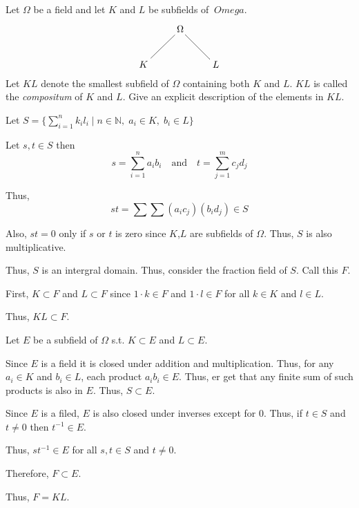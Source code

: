 \documentclass[12pt, letterpaper]{article}
\newcommand{\N}{\mathbb{N}}
\renewcommand{\t}[1]{\text{#1}}
\begin{document}
\color{\TextColor}
\pagecolor{\colormode}
\setlength{\parindent}{0pt}
\pagestyle{fancy}
\fancyhf{}
\fancyhead[ROE]{\color{\TextColor}\thepage}

\begin{problem}{}
    Let $\Omega$ be a field and let $K$ and $L$ be subfields of $\
Omega$.
\begin{equation*}
\xymatrix{
& \Omega\ar@{-}[dl]\ar@{-}[dr] &\\
K\ar@{-} & & L\ar@{-}\\
}
\end{equation*}
Let $KL$ denote the smallest subfield of $\Omega$ containing both $K$ and $L$. $KL$
is called the \textit{compositum} of $K$ and $L$. Give an explicit description of
the elements in $KL$.
\end{problem}
\begin{solution}
\setlength{\parindent}{0pt}
Let $S=\{\sum_{i=1}^n k_il_i \mid n \in \N,\; a_i \in K,\; b_i \in L\}$

Let $s,t \in S$ then
\[s=\sum_{i=1}^n a_ib_i \quad \t{and} \quad t=\sum_{j=1}^m c_jd_j\]

Thus,
\[st=\sum \sum (a_ic_j)(b_id_j) \in S\]

Also, $st=0$ only if $s$ or $t$ is zero since $K$,$L$ are subfields of $\Omega$. Thus, $S$ is also multiplicative.

Thus, $S$ is an intergral domain. Thus, consider the fraction field of $S$. Call this $F$.

First, $K \subset F$ and $L \subset F$ since $1 \cdot k \in F$ and $1 \cdot l \in F$ for all $k \in K$ and $l \in L$.

Thus, $KL \subset F$.

Let $E$ be a subfield of $\Omega$ s.t. $K \subset E$ and $L \subset E$.

Since $E$ is a field it is closed under addition and multiplication. Thus, for any $a_i \in K$ and $b_i \in L$, each product $a_ib_i \in E$. Thus, er get that any finite sum of such products is also in $E$. Thus, $S \subset E$.

Since $E$ is a filed, $E$ is also closed under inverses except for 0. Thus, if $t \in S$ and $t\neq 0$ then $t^{-1} \in E$.

Thus, $st^{-1} \in E$ for all $s,t \in S$ and $t \neq 0$.

Therefore, $F \subset E$.

Thus, $F = KL$.
\end{solution}
\end{document}
